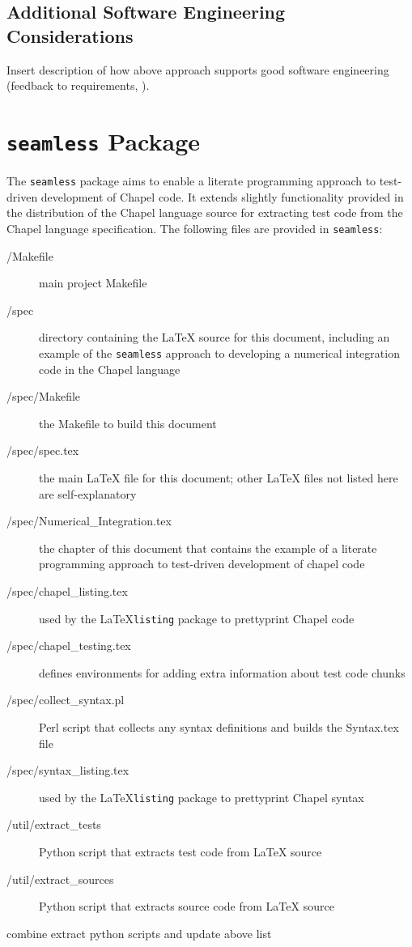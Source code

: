 \subsection{Additional Software Engineering Considerations}

\begin{TODO}
Insert description of how above approach supports good software engineering (feedback to requirements, \etc).
\end{TODO}

\section{\texttt{seamless} Package}
The \lstinline{seamless} package aims to enable a literate programming approach to test-driven
development of Chapel code. It extends slightly functionality provided in the distribution
of the Chapel language source for extracting test code from the Chapel language specification.
The following files are provided in \lstinline{seamless}:
\begin{description}
\item[/Makefile] main project Makefile
\item[/spec] directory containing the \LaTeX\xspace source for this document, including an 
example of the \lstinline{seamless} approach to developing a numerical integration code in the Chapel language
\item[/spec/Makefile] the Makefile to build this document
\item[/spec/spec.tex] the main \LaTeX\xspace file for this document; other \LaTeX\xspace files not 
listed here are self-explanatory
\item[/spec/Numerical\_Integration.tex] the chapter of this document that contains the example of a literate
programming approach to test-driven development of chapel code
\item[/spec/chapel\_listing.tex] used by the \LaTeX\xspace \lstinline{listing} package to prettyprint Chapel code
\item[/spec/chapel\_testing.tex] defines environments for adding extra information about
test code chunks 
\item[/spec/collect\_syntax.pl] Perl script that collects any syntax definitions and builds the Syntax.tex
file
\item[/spec/syntax\_listing.tex] used by the \LaTeX\xspace \lstinline{listing} package to prettyprint Chapel syntax
\item[/util/extract\_tests] Python script that extracts test code from \LaTeX\xspace source
\item[/util/extract\_sources] Python script that extracts source code from \LaTeX\xspace source 
\end{description}
\begin{TODO}
combine extract python scripts and update above list
\end{TODO}

